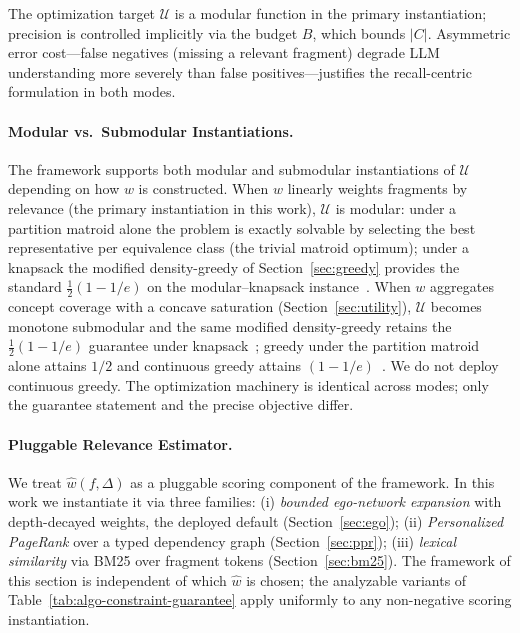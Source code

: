 \documentclass[11pt, a4paper]{article}
\begin{document}
The optimization target $\mathcal{U}$ is a modular function in the primary instantiation; precision is controlled implicitly via the budget $B$, which bounds $|C|$. Asymmetric error cost---false negatives (missing a relevant fragment) degrade LLM understanding more severely than false positives---justifies the recall-centric formulation in both modes.

\paragraph{Modular vs.\ Submodular Instantiations.} The framework supports both modular and submodular instantiations of $\mathcal{U}$ depending on how $w$ is constructed. When $w$ linearly weights fragments by relevance (the primary instantiation in this work), $\mathcal{U}$ is modular: under a partition matroid alone the problem is exactly solvable by selecting the best representative per equivalence class (the trivial matroid optimum); under a knapsack the modified density-greedy of Section~\ref{sec:greedy} provides the standard $\frac{1}{2}(1-1/e)$ on the modular--knapsack instance~\cite{khuller1999budgeted}. When $w$ aggregates concept coverage with a concave saturation (Section~\ref{sec:utility}), $\mathcal{U}$ becomes monotone submodular and the same modified density-greedy retains the $\frac{1}{2}(1-1/e)$ guarantee under knapsack~\cite{khuller1999budgeted,sviridenko2004note}; greedy under the partition matroid alone attains $1/2$ and continuous greedy attains $(1-1/e)$~\cite{nemhauser1978analysis,calinescu2011maximizing}. We do not deploy continuous greedy. The optimization machinery is identical across modes; only the guarantee statement and the precise objective differ.

\paragraph{Pluggable Relevance Estimator.} We treat $\hat{w}(f, \Delta)$ as a pluggable scoring component of the framework. In this work we instantiate it via three families: (i) \emph{bounded ego-network expansion} with depth-decayed weights, the deployed default (Section~\ref{sec:ego}); (ii) \emph{Personalized PageRank} over a typed dependency graph (Section~\ref{sec:ppr}); (iii) \emph{lexical similarity} via BM25 over fragment tokens (Section~\ref{sec:bm25}). The framework of this section is independent of which $\hat{w}$ is chosen; the analyzable variants of Table~\ref{tab:algo-constraint-guarantee} apply uniformly to any non-negative scoring instantiation.
\end{document}
